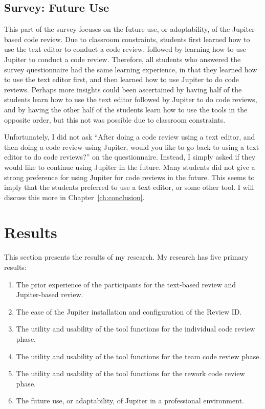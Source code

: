 \subsection{Survey: Future Use}
\label{subsec:survey:-future-use}

This part of the survey focuses on the future use, or adoptability, of the Jupiter-based code review. Due to classroom constraints, students first learned how to use the text editor to conduct a code review, followed by learning how to use Jupiter to conduct a code review. Therefore, all students who answered the survey questionnaire had the same learning experience, in that they learned how to use the text editor first, and then learned how to use Jupiter to do code reviews. Perhaps more insights could been ascertained by having half of the students learn how to use the text editor followed by Jupiter to do code reviews, and by having the other half of the students learn how to use the tools in the opposite order, but this not was possible due to classroom constraints.

Unfortunately, I did not ask ``After doing a code review using a text editor, and then doing a code review using Jupiter, would you like to go back to using a text editor to do code reviews?'' on the questionnaire. Instead, I simply asked if they would like to continue using Jupiter in the future. Many students did not give a strong preference for using Jupiter for code reviews in the future. This seems to imply that the students preferred to use a text editor, or some other tool. I will discuss this more in Chapter~\ref{ch:conclusion}.

\section{Results}
\label{sec:results}

This section presents the results of my research. My research has five primary results:

\begin{enumerate}
	\item The prior experience of the participants for the text-based review and Jupiter-based review.
	\item The ease of the Jupiter installation and configuration of the Review ID.
	\item The utility and usability of the tool functions for the individual code review phase.
	\item The utility and usability of the tool functions for the team code review phase.
	\item The utility and usability of the tool functions for the rework code review phase.
	\item The future use, or adaptability, of Jupiter in a professional environment.
\end{enumerate}

